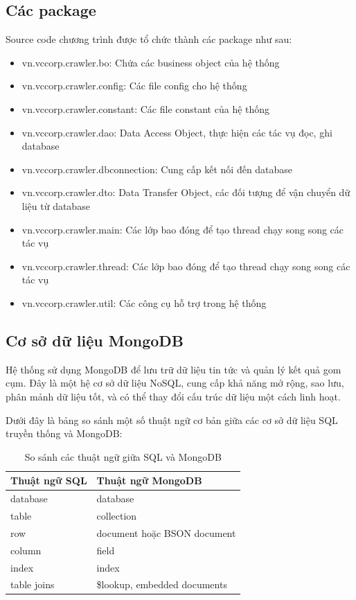 	\subsection{Các package}
	Source code chương trình được tổ chức thành các package như sau:
	\begin{itemize}
		\item vn.vccorp.crawler.bo: Chứa các business object của hệ thống
		\item vn.vccorp.crawler.config: Các file config cho hệ thống
		\item vn.vccorp.crawler.constant: Các file constant của hệ thống
		\item vn.vccorp.crawler.dao: Data Access Object, thực hiện các tác vụ đọc, ghi database
		\item vn.vccorp.crawler.dbconnection: Cung cấp kết nối đến database
		\item vn.vccorp.crawler.dto: Data Transfer Object, các đối tượng để vận chuyển dữ liệu từ database
		\item vn.vccorp.crawler.main: Các lớp bao đóng để tạo thread chạy song song các tác vụ
		\item vn.vccorp.crawler.thread: Các lớp bao đóng để tạo thread chạy song song các tác vụ
		\item vn.vccorp.crawler.util: Các công cụ hỗ trợ trong hệ thống
		
	\end{itemize}
	
	\subsection{Cơ sở dữ liệu MongoDB}
	Hệ thống sử dụng MongoDB để lưu trữ dữ liệu tin tức và quản lý kết quả gom cụm. Đây là một hệ cơ sở dữ liệu NoSQL, cung cấp khả năng mở rộng, sao lưu, phân mảnh dữ liệu tốt, và có thể thay đổi cấu trúc dữ liệu một cách linh hoạt.
	
	Dưới đây là bảng so sánh một số thuật ngữ cơ bản giữa các cơ sở dữ liệu SQL truyền thống và MongoDB:
	\begin{table}[H]
		\centering
		\setlength\extrarowheight{3pt}
		\begin{tabular}{|l|l|}
			\hline
			\textbf{Thuật ngữ SQL}	& \textbf{Thuật ngữ MongoDB}  \\\hline
			database	& database \\\hline
			table		& collection \\\hline
			row			& document hoặc BSON document \\\hline
			column		& field \\\hline
			index		& index \\\hline
			table joins	& \$lookup, embedded documents \\\hline
		\end{tabular}
		\caption{So sánh các thuật ngữ giữa SQL và MongoDB}
		\label{tab:table_3_1}
	\end{table}
	
